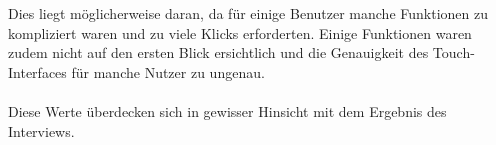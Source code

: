 Dies liegt möglicherweise daran, da für einige Benutzer manche Funktionen zu kompliziert waren und zu viele Klicks erforderten.
Einige Funktionen waren zudem nicht auf den ersten Blick ersichtlich und die Genauigkeit des Touch-Interfaces für manche Nutzer zu ungenau.
\\
\\
Diese Werte überdecken sich in gewisser Hinsicht mit dem Ergebnis des Interviews.
\\
\\



